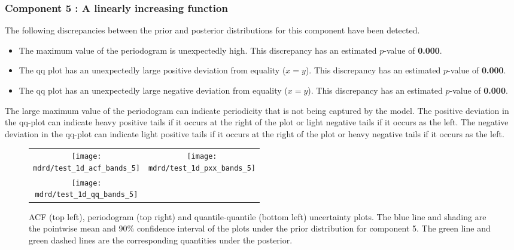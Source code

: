\documentclass{article} %
\begin{document}
\subsubsection{Component 5 : A linearly increasing function}


The following discrepancies between the prior and posterior distributions for this component have been detected.

\begin{itemize}

    \item The maximum value of the periodogram is unexpectedly high. This discrepancy has an estimated $p$-value of \textbf{0.000}.
    \item The qq plot has an unexpectedly large positive deviation from equality ($x = y$). This discrepancy has an estimated $p$-value of \textbf{0.000}.
    \item The qq plot has an unexpectedly large negative deviation from equality ($x = y$). This discrepancy has an estimated $p$-value of \textbf{0.000}.
\end{itemize}

The large maximum value of the periodogram can indicate periodicity that is not being captured by the model.
The positive deviation in the qq-plot can indicate heavy positive tails if it occurs at the right of the plot or light negative tails if it occurs as the left.
The negative deviation in the qq-plot can indicate light positive tails if it occurs at the right of the plot or heavy negative tails if it occurs as the left.


\begin{figure}[H]
\newcommand{\wmgd}{0.5\columnwidth}
\newcommand{\hmgd}{3.0cm}
\newcommand{\mdrd}{test_1d}
\newcommand{\mbm}{\hspace{-0.3cm}}
\begin{tabular}{cc}
\mbm \texttt{[image: \\mdrd/test\_1d\_acf\_bands\_5]} & \texttt{[image: \\mdrd/test\_1d\_pxx\_bands\_5]} \\
\mbm \texttt{[image: \\mdrd/test\_1d\_qq\_bands\_5]}
\end{tabular}
\caption{
ACF (top left), periodogram (top right) and quantile-quantile (bottom left) uncertainty plots.
The blue line and shading are the pointwise mean and 90\% confidence interval of the plots under the prior distribution for component 5.
The green line and green dashed lines are the corresponding quantities under the posterior.}
\label{fig:check5}
\end{figure}
\end{document}
